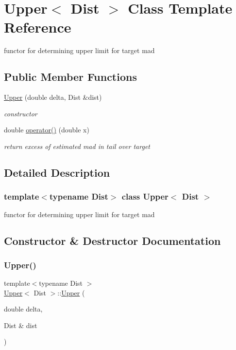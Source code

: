 \hypertarget{classUpper}{}\section{Upper$<$ Dist $>$ Class Template Reference}
\label{classUpper}


functor for determining upper limit for target mad  


\subsection*{Public Member Functions}
\begin{DoxyCompactItemize}
\item 
\mbox{\hyperlink{classUpper_a68d8d151df660873643dbb124b92c1b1}{Upper}} (double delta, Dist \&dist)
\begin{DoxyCompactList}\small\item\em constructor \end{DoxyCompactList}\item 
double \mbox{\hyperlink{classUpper_a589ae8e39d5958d96d6ec467a15bac1d}{operator()}} (double x)
\begin{DoxyCompactList}\small\item\em return excess of estimated mad in tail over target \end{DoxyCompactList}\end{DoxyCompactItemize}


\subsection{Detailed Description}
\subsubsection*{template$<$typename Dist$>$\newline
class Upper$<$ Dist $>$}

functor for determining upper limit for target mad 

\subsection{Constructor \& Destructor Documentation}
\mbox{\label{classUpper_a68d8d151df660873643dbb124b92c1b1}} 
\subsubsection{\texorpdfstring{Upper()}{Upper()}}
{\footnotesize\ttfamily template$<$typename Dist $>$ \\
\mbox{\hyperlink{classUpper}{Upper}}$<$ Dist $>$\+::\mbox{\hyperlink{classUpper}{Upper}} (\begin{DoxyParamCaption}\item[{double}]{delta,  }\item[{Dist \&}]{dist }\end{DoxyParamCaption})\hspace{0.3cm}{\ttfamily [inline]}}



